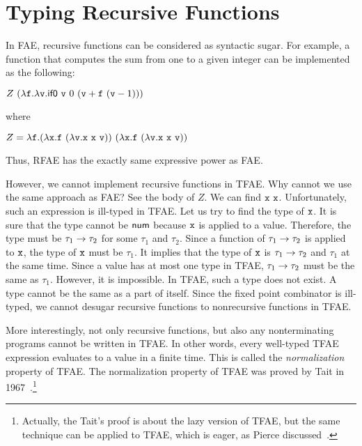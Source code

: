 
\chapter{Typing Recursive Functions}

\renewcommand{\plang}{\textsf{TFAE}\xspace}
\renewcommand{\Lang}{\textsf{TRFAE}\xspace}

In \textsf{FAE}, recursive functions can be considered as syntactic sugar.
For example, a function that computes the sum from one to a given integer
can be implemented as the following:

$Z\ (\efun{\cf}{\efun{\cv}{\sumbodyfv}})$

where

$
  Z=\efun{\cf}{\eapp
    {(\efun{\cx}{\eapp{\cf}{(\efun{\cv}{\eapp{\eapp{\cx}{\cx}}{\cv}})}})}
    {(\efun{\cx}{\eapp{\cf}{(\efun{\cv}{\eapp{\eapp{\cx}{\cx}}{\cv}})}})}
  }
$

Thus, \textsf{RFAE} has the exactly same expressive power as \textsf{FAE}.

However, we cannot implement recursive functions in \plang. Why cannot we
use the same approach as \textsf{FAE}? See the body of $Z$. We can find
$\texttt{x}\ \texttt{x}$. Unfortunately, such an expression is ill-typed in \plang.
Let us try to find the type of $\texttt{x}$. It is sure that the type cannot be $\textsf{num}$
because $\texttt{x}$ is applied to a value. Therefore, the type must be
$\tau_1\rightarrow\tau_2$ for some $\tau_1$ and $\tau_2$. Since a function
of $\tau_1\rightarrow\tau_2$ is applied to $\texttt{x}$, the type of $\texttt{x}$ must be
$\tau_1$. It implies that the type of $\texttt{x}$ is $\tau_1\rightarrow\tau_2$ and
$\tau_1$ at the same time. Since a value has at most one type in \plang,
$\tau_1\rightarrow\tau_2$ must be the same as $\tau_1$. However, it is
impossible. In \plang, such a type does not exist. A type cannot be the same as
a part of itself. Since the fixed point combinator is ill-typed, we cannot
desugar recursive functions to nonrecursive functions in \plang.

More interestingly, not only recursive functions, but also any nonterminating
programs cannot be written in \plang. In other words, every well-typed \plang
expression evaluates to a value in a finite time. This is called the
\textit{normalization} property of \plang. The
normalization property of \plang was proved by Tait in
1967~\cite{tait1967intensional}.\footnote{Actually, the Tait's proof is about
the lazy version of \plang, but the same technique can be applied to \plang,
which is eager, as Pierce discussed~\cite{pierce2002types}.}

